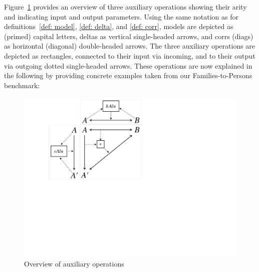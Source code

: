 Figure~\ref{fig:auxOperationsOverview} provides an overview of three auxiliary operations showing their arity and indicating input and output parameters.
Using the same notation as for definitions~\ref{def: model}, \ref{def: delta}, and \ref{def: corr}, models are depicted as (primed) capital letters, deltas as vertical single-headed arrows, and corrs (diags) as horizontal (diagonal) double-headed arrows.
The three auxiliary operations are depicted as rectangles, connected to their input via incoming, and to their output via outgoing dotted single-headed arrows. 
These operations are now explained in the following by providing concrete examples taken from our Families-to-Persons benchmark:

\begin{figure}[bt!]
	\centering
	\includegraphics[width=0.65\columnwidth]{diagrams/foundations/AuxOperations}
	\caption{Overview of auxiliary operations}
	\label{fig:auxOperationsOverview}
\end{figure}

